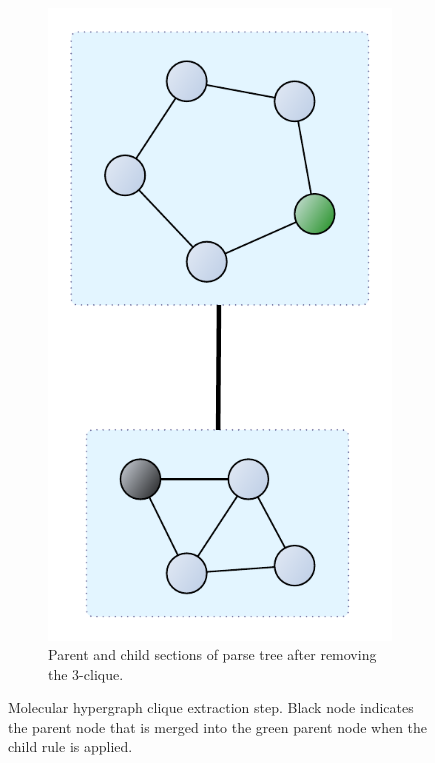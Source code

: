\documentclass{article}
\begin{document}
\begin{figure}
\begin{subfigure}[b]{0.48\textwidth}
        \includegraphics[scale=0.25]{images/mols_clique_collapsed.pdf}
        \caption{Parent and child sections of parse tree after removing the 3-clique.}
    \end{subfigure}
    \caption{Molecular hypergraph clique extraction step. Black node indicates the parent node that is merged into the green parent node when the child rule is applied.}
\end{figure}
\end{document}
